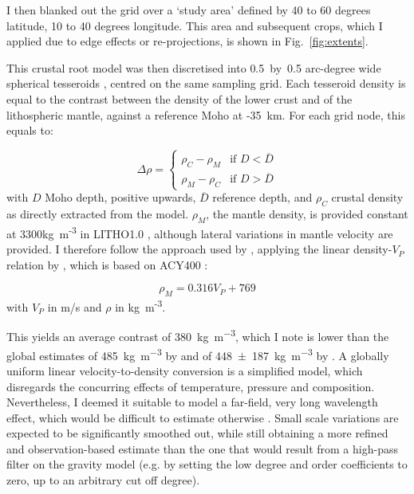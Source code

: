 I then blanked out the grid over a `study area' defined by 40 to 60 degrees latitude, 10 to 40 degrees longitude.
This area and subsequent crops, which I applied due to edge effects or re-projections, is shown in Fig.~\ref{fig:extents}.

This crustal root model was then discretised into {0.5}~by~{0.5} arc-degree wide spherical tesseroids \parencite{Uieda2016}, centred on the same sampling grid.
Each tesseroid density is equal to the contrast between the density of the lower crust and of the lithospheric mantle, against a reference Moho at {-35}~\si{\kilo \metre}.
For each grid node, this equals to:

\begin{equation}
	\label{eq:RhoContrast}
	\Delta \rho = \begin{cases}
		\rho_{C} - \rho_{M} & \mbox{if } D < \overline{D} \\ 
	    \rho_{M} - \rho_{C} & \mbox{if } D > \overline{D}
    \end{cases}
\end{equation}
with $D$ Moho depth, positive upwards, $\overline{D}$ reference depth, and $\rho_{C}$ crustal density as directly extracted from the model.
$\rho_{M}$, the mantle density, is provided constant at 3300{kg~m\textsuperscript{-3}} in {LITHO1.0} \parencite{Pasyanos2014}, although lateral variations in mantle velocity are provided.
I therefore follow the approach used by \textcite{Sebera2018}, applying the linear density-$V_P$ relation by \textcite{Yegorova2015}, which is based on {ACY400} \parencite{Montagner1989}:

\begin{equation}
	\label{eq:ACY400}
	\rho_M = 0.316 V_P + 769
\end{equation}
with $V_P$ in m/s and $\rho$ in {kg~m\textsuperscript{-3}}.

This yields an average contrast of 380~\si{\kilo \gram \per \cubic \metre}, which I note is lower than the global estimates of 485~\si{\kilo \gram \per \cubic \metre} by \textcite{Tenzer2012contrast} and of 448~$\pm$~187~\si{\kilo \gram \per \cubic \metre} by \textcite{Sjoberg2011}.
A globally uniform linear velocity-to-density conversion is a simplified model, which disregards the concurring effects of temperature, pressure and composition.
Nevertheless, I deemed it suitable to model a far-field, very long wavelength effect, which would be difficult to estimate otherwise \parencite[for a different approach, based on topography and the Airy-Heiskanen isostatic model, see][]{Grombein2016}.
Small scale variations are expected to be significantly smoothed out, while still obtaining a more refined and observation-based estimate than the one that would result from a high-pass filter on the gravity model (e.g. by setting the low degree and order coefficients to zero, up to an arbitrary cut off degree).

